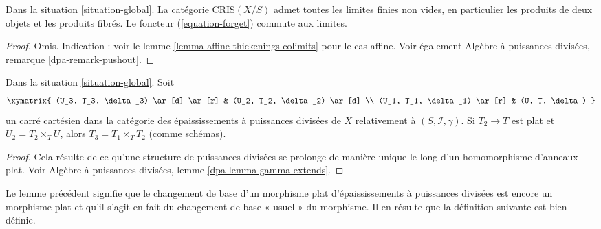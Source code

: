 \begin{lemma}
\label{lemma-divided-power-thickening-fibre-products}
Dans la situation \ref{situation-global}.
La catégorie $\text{CRIS}(X/S)$ admet toutes les limites finies non vides,
en particulier les produits de deux objets et les produits fibrés.
Le foncteur (\ref{equation-forget}) commute aux limites.
\end{lemma}

\begin{proof}
Omis. Indication : voir le lemme \ref{lemma-affine-thickenings-colimits}
pour le cas affine. Voir également
Algèbre à puissances divisées, remarque \ref{dpa-remark-pushout}.
\end{proof}

\begin{lemma}
\label{lemma-divided-power-thickening-base-change-flat}
Dans la situation \ref{situation-global}. Soit
$$
\xymatrix{
(U_3, T_3, \delta_3) \ar[d] \ar[r] & (U_2, T_2, \delta_2) \ar[d] \\
(U_1, T_1, \delta_1) \ar[r] & (U, T, \delta)
}
$$
un carré cartésien dans la catégorie des épaississements à puissances divisées de
$X$ relativement à $(S, \mathcal{I}, \gamma)$. Si $T_2 \to T$ est
plat et $U_2 = T_2 \times_T U$, alors $T_3 = T_1 \times_T T_2$ (comme schémas).
\end{lemma}

\begin{proof}
Cela résulte de ce qu'une structure de puissances divisées se prolonge de manière unique
le long d'un homomorphisme d'anneaux plat. Voir
Algèbre à puissances divisées, lemme \ref{dpa-lemma-gamma-extends}.
\end{proof}

\noindent
Le lemme précédent signifie que le changement de base d'un morphisme plat
d'épaississements à puissances divisées est encore un morphisme plat et qu'il
s'agit en fait du changement de base « usuel » du morphisme. Il en résulte
que la définition suivante est bien définie.

